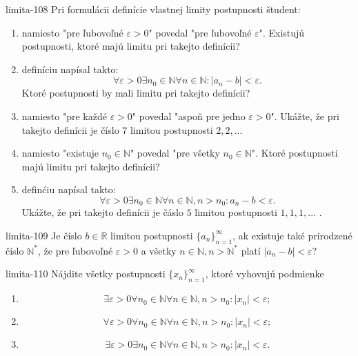 \begin{defproblem}{limita-108}
Pri formulácii definície vlastnej limity postupnosti študent:
\begin{enumerate}
\item namiesto "pre ľubovoľné $\varepsilon > 0$" povedal "pre ľubovoľné $\varepsilon$". Existujú postupnosti, ktoré majú limitu pri takejto definícii?
\item definíciu napísal takto:
$$\forall \varepsilon > 0 \exists n_0 \in \mathbb{N} \forall n \in \mathbb{N}: |a_n-b|<\varepsilon.$$
Ktoré postupnosti by mali limitu pri takejto definícii?
\item namiesto "pre každé $\varepsilon > 0$" povedal "aspoň pre jedno $\varepsilon > 0$". Ukážte, že pri takejto definícii je číslo $7$ limitou postupnosti $2,2, ...$
\item namiesto "existuje $n_0 \in \mathbb{N}$" povedal "pre všetky $n_0 \in \mathbb{N}$". Ktoré postupnosti majú limitu pri takejto definícii?
\item definćiu napísal takto:
$$\forall \varepsilon > 0 \exists n_0 \in \mathbb{N} \forall n \in \mathbb{N},n>n_0:a_n-b<\varepsilon.$$
Ukážte, že pri takejto definícii je čáslo $5$ limitou postupnosti $1,1,1,...$ .
\end{enumerate}
\end{defproblem}

\begin{defproblem}{limita-109}
Je číslo $b \in \mathbb{R}$ limitou postupnosti ${\{a_n\}}_{n=1}^\infty$, ak existuje také prirodzené číslo $\mathbb{N^*}$, že pre ľubovoľné $\varepsilon>0$ a všetky $n \in \mathbb{N}, n>\mathbb{N^*}$ platí $|a_n-b|<\varepsilon$?
\end{defproblem}

\begin{defproblem}{limita-110}
Nájdite všetky postupnosti ${\{x_n\}}_{n=1}^\infty$, ktoré vyhovujú podmienke
\begin{enumerate}
\item $$\exists \varepsilon>0 \forall n_0 \in \mathbb{N} \forall n \in \mathbb{N}, n>n_0: |x_n|<\varepsilon; $$
\item $$\forall \varepsilon>0 \forall n_0 \in \mathbb{N} \forall n \in \mathbb{N}, n>n_0: |x_n|<\varepsilon; $$
\item $$\exists \varepsilon>0 \exists n_0 \in \mathbb{N} \forall n \in \mathbb{N}, n>n_0: |x_n|<\varepsilon. $$
\end{enumerate}
\end{defproblem}

